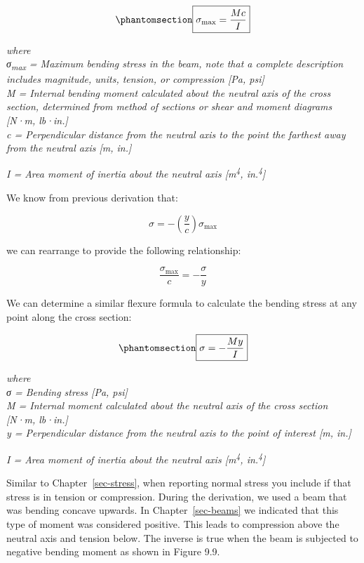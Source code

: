 \documentclass[
  letterpaper,
  DIV=11,
  numbers=noendperiod]{scrreprt}
\theoremstyle{definition}
\theoremstyle{remark}
\begin{document}
\begin{equation}\phantomsection\label{eq-9.1}{
\boxed{\sigma_{\max }=\frac{M c}{I}}
}\end{equation}

\emph{where}\\
\emph{σ\textsubscript{max} = Maximum bending stress in the beam, note
that a complete description includes magnitude, units, tension, or
compression {[}Pa, psi{]}}\\
\emph{M = Internal bending moment calculated about the neutral axis of
the cross section, determined from method of sections or shear and
moment diagrams {[}N·m, lb·in.{]}}\\
\emph{c = Perpendicular distance from the neutral axis to the point the
farthest away from the neutral axis {[}m, in.{]}}

\emph{I = Area moment of inertia about the neutral axis
{[}m\textsuperscript{4}, in.\textsuperscript{4}{]}}

We know from previous derivation that:

\[
\sigma=-\left(\frac{y}{c}\right) \sigma_{\max }
\]

we can rearrange to provide the following relationship:

\[
\frac{\sigma_{\max }}{c}=-\frac{\sigma}{y}
\]

We can determine a similar flexure formula to calculate the bending
stress at any point along the cross section:

\begin{equation}\phantomsection\label{eq-9.2}{
\boxed{\sigma=-\frac{M y}{I}}
}\end{equation}

\emph{where}\\
\emph{σ = Bending stress {[}Pa, psi{]}}\\
\emph{M = Internal moment calculated about the neutral axis of the cross
section {[}N·m, lb·in.{]}}\\
\emph{y = Perpendicular distance from the neutral axis to the point of
interest {[}m, in.{]}}

\emph{I = Area moment of inertia about the neutral axis
{[}m\textsuperscript{4}, in.\textsuperscript{4}{]}}

Similar to Chapter~\ref{sec-stress}, when reporting normal stress you
include if that stress is in tension or compression. During the
derivation, we used a beam that was bending concave upwards. In
Chapter~\ref{sec-beams} we indicated that this type of moment was
considered positive. This leads to compression above the neutral axis
and tension below. The inverse is true when the beam is subjected to
negative bending moment as shown in Figure 9.9.
\end{document}
